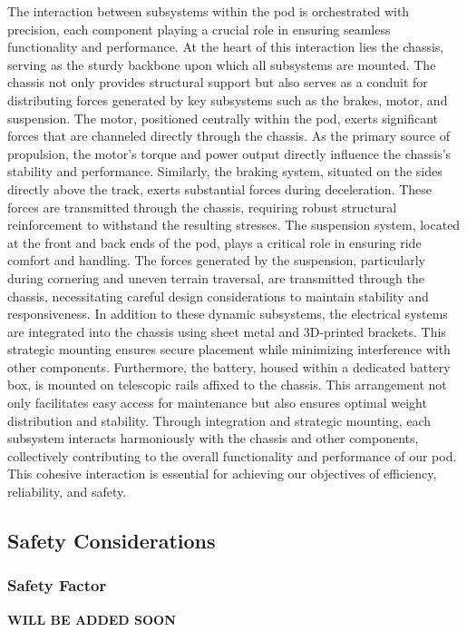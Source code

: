 The interaction between subsystems within the pod is orchestrated with precision, each component playing a crucial role in ensuring seamless functionality and performance.
At the heart of this interaction lies the chassis, serving as the sturdy backbone upon which all subsystems are mounted. The chassis not only provides structural support but also serves as a conduit for distributing forces generated by key subsystems such as the brakes, motor, and suspension.
The motor, positioned centrally within the pod, exerts significant forces that are channeled directly through the chassis. As the primary source of propulsion, the motor's torque and power output directly influence the chassis's stability and performance.
Similarly, the braking system, situated on the sides directly above the track, exerts substantial forces during deceleration. These forces are transmitted through the chassis, requiring robust structural reinforcement to withstand the resulting stresses.
The suspension system, located at the front and back ends of the pod, plays a critical role in ensuring ride comfort and handling. The forces generated by the suspension, particularly during cornering and uneven terrain traversal, are transmitted through the chassis, necessitating careful design considerations to maintain stability and responsiveness.
In addition to these dynamic subsystems, the electrical systems are integrated into the chassis using sheet metal and 3D-printed brackets. This strategic mounting ensures secure placement while minimizing interference with other components.
Furthermore, the battery, housed within a dedicated battery box, is mounted on telescopic rails affixed to the chassis. This arrangement not only facilitates easy access for maintenance but also ensures optimal weight distribution and stability.
Through integration and strategic mounting, each subsystem interacts harmoniously with the chassis and other components, collectively contributing to the overall functionality and performance of our pod. This cohesive interaction is essential for achieving our objectives of efficiency, reliability, and safety.



\subsection{Safety Considerations}
\subsubsection{Safety Factor}
\textbf{WILL BE ADDED SOON}
